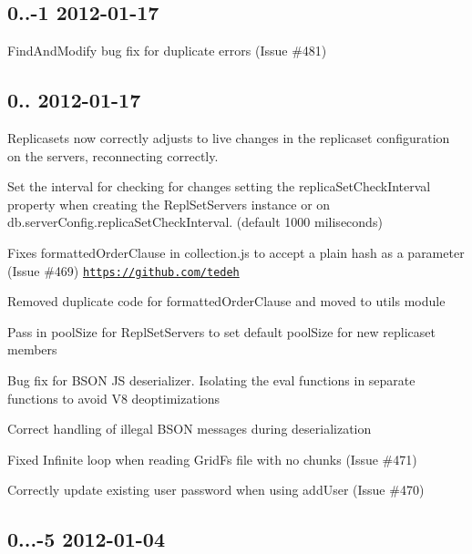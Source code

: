 \subsection*{0..-\/1 2012-\/01-\/17 }


\begin{DoxyItemize}
\item Find\+And\+Modify bug fix for duplicate errors (Issue \#481)
\end{DoxyItemize}

\subsection*{0.. 2012-\/01-\/17 }


\begin{DoxyItemize}
\item Replicasets now correctly adjusts to live changes in the replicaset configuration on the servers, reconnecting correctly.
\begin{DoxyItemize}
\item Set the interval for checking for changes setting the replica\+Set\+Check\+Interval property when creating the Repl\+Set\+Servers instance or on db.\+server\+Config.\+replica\+Set\+Check\+Interval. (default 1000 miliseconds)
\end{DoxyItemize}
\item Fixes formatted\+Order\+Clause in collection.\+js to accept a plain hash as a parameter (Issue \#469) \href{https://github.com/tedeh}{\tt https\+://github.\+com/tedeh}
\item Removed duplicate code for formatted\+Order\+Clause and moved to utils module
\item Pass in pool\+Size for Repl\+Set\+Servers to set default pool\+Size for new replicaset members
\item Bug fix for B\+S\+ON JS deserializer. Isolating the eval functions in separate functions to avoid V8 deoptimizations
\item Correct handling of illegal B\+S\+ON messages during deserialization
\item Fixed Infinite loop when reading Grid\+Fs file with no chunks (Issue \#471)
\item Correctly update existing user password when using add\+User (Issue \#470)
\end{DoxyItemize}

\subsection*{0...-\/5 2012-\/01-\/04 }


